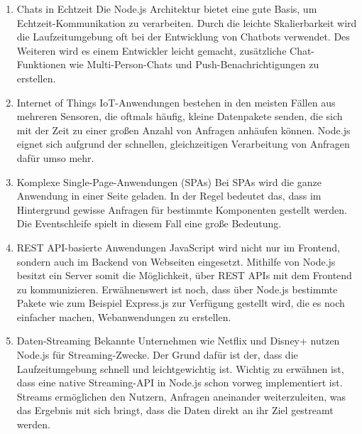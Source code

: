 \begin{enumerate}
    \item Chats in Echtzeit
    \newline Die Node.js Architektur bietet eine gute Basis, um Echtzeit-Kommunikation zu verarbeiten. Durch die leichte Skalierbarkeit wird die Laufzeitumgebung oft bei der Entwicklung von Chatbots verwendet. Des Weiteren wird es einem Entwickler leicht gemacht, zusätzliche Chat-Funktionen wie Multi-Person-Chats und Push-Benachrichtigungen zu erstellen.
    \item Internet of Things
    \newline
    IoT-Anwendungen bestehen in den meisten Fällen aus mehreren Sensoren, die oftmals häufig, kleine Datenpakete senden, die sich mit der Zeit zu einer großen Anzahl von Anfragen anhäufen können. Node.js eignet sich aufgrund der schnellen, gleichzeitigen Verarbeitung von Anfragen dafür umso mehr.
    \item Komplexe Single-Page-Anwendungen (SPAs)
    \newline
    Bei SPAs wird die ganze Anwendung in einer Seite geladen. In der Regel bedeutet das, dass im Hintergrund gewisse Anfragen für bestimmte Komponenten gestellt werden. Die Eventschleife spielt in diesem Fall eine große Bedeutung.
    \item REST API-basierte Anwendungen
    \newline
    JavaScript wird nicht nur im Frontend, sondern auch im Backend von Webseiten eingesetzt. Mithilfe von Node.js besitzt ein Server somit die Möglichkeit, über REST APIs mit dem Frontend zu kommunizieren. Erwähnenswert ist noch, dass über Node.js bestimmte Pakete wie zum Beispiel Express.js zur Verfügung gestellt wird, die es noch einfacher machen, Webanwendungen zu erstellen.
    \item Daten-Streaming
    \newline
    Bekannte Unternehmen wie Netflix und Disney+ nutzen Node.js für Streaming-Zwecke. Der Grund dafür ist der, dass die Laufzeitumgebung schnell und leichtgewichtig ist. Wichtig zu erwähnen ist, dass eine native Streaming-API in Node.js schon vorweg implementiert ist. Streams ermöglichen den Nutzern, Anfragen aneinander weiterzuleiten, was das Ergebnis mit sich bringt, dass die Daten direkt an ihr Ziel gestreamt werden.
    
   \end{enumerate}
\cite{Anwendungen}




